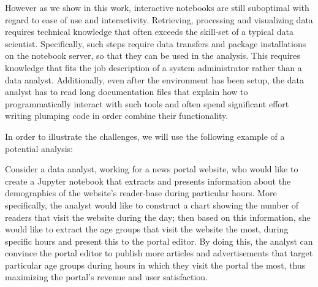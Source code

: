 However as we show in this work, interactive notebooks are still suboptimal with regard to ease of use and interactivity. Retrieving, processing and visualizing data requires technical knowledge that often exceeds the skill-set of a typical data scientist. Specifically, such steps require data transfers and package installations on the notebook server, so that they can be used in the analysis. This requires knowledge that fits the job description of a system administrator rather than a data analyst. Additionally, even after the environment has been setup, the data analyst has to read long documentation files that explain how to programmatically interact with such tools and often spend significant effort writing plumping code in order combine their functionality.


In order to illustrate the challenges, we will use the following example of a potential analysis:

\begin{example}
Consider a data analyst, working for a news portal website, who would like to create a Jupyter notebook that extracts and presents information about the demographics of the website's reader-base during particular hours. More specifically, the analyst would like to construct a chart showing the number of readers that visit the website during the day; then based on this information, she would like to extract the age groups that visit the website the most, during specific hours and present this to the portal editor. By doing this, the analyst can convince the portal editor to publish more articles and advertisements that target particular age groups during hours in which they visit the portal the most, thus maximizing the portal's revenue and user satisfaction.
\end{example}


